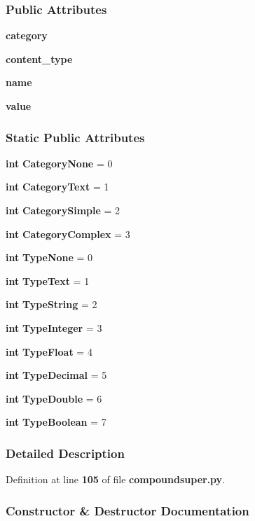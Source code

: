 \subsubsection*{Public Attributes}
\begin{DoxyCompactItemize}
\item 
{\bf category}
\item 
{\bf content\+\_\+type}
\item 
{\bf name}
\item 
{\bf value}
\end{DoxyCompactItemize}
\subsubsection*{Static Public Attributes}
\begin{DoxyCompactItemize}
\item 
{\bf int} {\bf Category\+None} = 0
\item 
{\bf int} {\bf Category\+Text} = 1
\item 
{\bf int} {\bf Category\+Simple} = 2
\item 
{\bf int} {\bf Category\+Complex} = 3
\item 
{\bf int} {\bf Type\+None} = 0
\item 
{\bf int} {\bf Type\+Text} = 1
\item 
{\bf int} {\bf Type\+String} = 2
\item 
{\bf int} {\bf Type\+Integer} = 3
\item 
{\bf int} {\bf Type\+Float} = 4
\item 
{\bf int} {\bf Type\+Decimal} = 5
\item 
{\bf int} {\bf Type\+Double} = 6
\item 
{\bf int} {\bf Type\+Boolean} = 7
\end{DoxyCompactItemize}


\subsubsection{Detailed Description}


Definition at line {\bf 105} of file {\bf compoundsuper.\+py}.



\subsubsection{Constructor \& Destructor Documentation}
